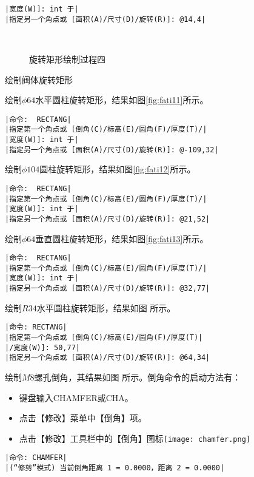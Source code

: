 \begin{procedure}
\begin{lstlisting}
|宽度(W)]: int 于|
|指定另一个角点或 [面积(A)/尺寸(D)/旋转(R)]: @14,4|
\end{lstlisting}
\begin{figure}[htbp]
\centering
{}\hspace{30pt}
\\
\hspace{30pt}
\caption{旋转矩形绘制过程四}
\end{figure}
\item 绘制阀体旋转矩形

绘制$\phi 64$水平圆柱旋转矩形，结果如图\ref{fig:fati11}所示。
\begin{lstlisting}
|命令:  RECTANG|
|指定第一个角点或 [倒角(C)/标高(E)/圆角(F)/厚度(T)/|
|宽度(W)]: int 于|
|指定另一个角点或 [面积(A)/尺寸(D)/旋转(R)]: @-109,32|
\end{lstlisting}
绘制$\phi 104$圆柱旋转矩形，结果如图\ref{fig:fati12}所示。
\begin{lstlisting}
|命令:  RECTANG|
|指定第一个角点或 [倒角(C)/标高(E)/圆角(F)/厚度(T)/|
|宽度(W)]: int 于|
|指定另一个角点或 [面积(A)/尺寸(D)/旋转(R)]: @21,52|
\end{lstlisting}
绘制$\phi 64$垂直圆柱旋转矩形，结果如图\ref{fig:fati13}所示。
\begin{lstlisting}
|命令:  RECTANG|
|指定第一个角点或 [倒角(C)/标高(E)/圆角(F)/厚度(T)/|
|宽度(W)]: int 于|
|指定另一个角点或 [面积(A)/尺寸(D)/旋转(R)]: @32,77|
\end{lstlisting}
绘制$R34$水平圆柱旋转矩形，结果如图 所示。
\begin{lstlisting}
|命令: RECTANG|
|指定第一个角点或 [倒角(C)/标高(E)/圆角(F)/厚度(T)|
|/宽度(W)]: 50,77|
|指定另一个角点或 [面积(A)/尺寸(D)/旋转(R)]: @64,34|
\end{lstlisting}
绘制$M8$螺孔倒角，其结果如图 所示。倒角命令的启动方法有：
\begin{itemize}
\item 键盘输入CHAMFER或CHA。
\item 点击【修改】菜单中【倒角】项。
\item 点击【修改】工具栏中的【倒角】图标\texttt{[image: chamfer.png]}
\end{itemize}
\begin{lstlisting}
|命令: CHAMFER|
|(“修剪”模式) 当前倒角距离 1 = 0.0000，距离 2 = 0.0000|

\end{lstlisting}
\end{procedure}
